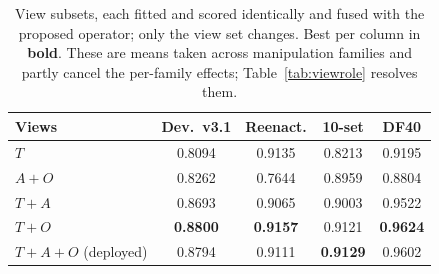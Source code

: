 \begin{table}[t]
\centering
\caption{View subsets, each fitted and scored identically and fused with the proposed operator; only the view set changes. Best per column in \textbf{bold}. These are means taken across manipulation families and partly cancel the per-family effects; Table~\ref{tab:viewrole} resolves them.}
\label{tab:views}
\small
\begin{tabular}{lcccc}
\toprule
Views & Dev.\ v3.1 & Reenact. & 10-set & DF40 \\
\midrule
$T$ & 0.8094 & 0.9135 & 0.8213 & 0.9195 \\
$A{+}O$ & 0.8262 & 0.7644 & 0.8959 & 0.8804 \\
$T{+}A$ & 0.8693 & 0.9065 & 0.9003 & 0.9522 \\
$T{+}O$ & \textbf{0.8800} & \textbf{0.9157} & 0.9121 & \textbf{0.9624} \\
$T{+}A{+}O$ (deployed) & 0.8794 & 0.9111 & \textbf{0.9129} & 0.9602 \\
\bottomrule
\end{tabular}
\end{table}
